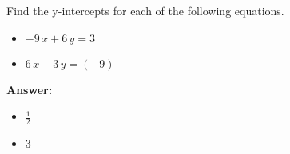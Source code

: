  Find the y-intercepts for each of the following equations. \begin{itemize}\item \( -9 \, x + 6 \, y = 3 \)\item \( 6 \, x - 3 \, y = \left(-9\right) \)\end{itemize}

        \textbf{Answer:} \begin{itemize}\item \( \frac{1}{2} \)\item \( 3 \)\end{itemize}
